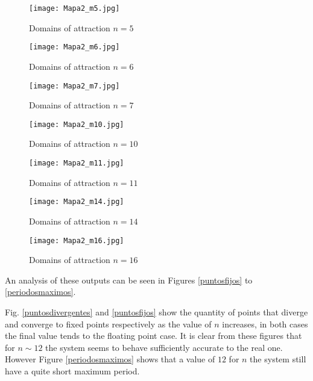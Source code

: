 \documentclass[conference]{IEEEtran}
\begin{document}
\begin{figure}
    \centering
    \texttt{[image: Mapa2\_m5.jpg]}\\
    \caption{Domains of attraction $n=5$}\label{m5otro}
\end{figure}

\begin{figure}
    \centering
    \texttt{[image: Mapa2\_m6.jpg]}\\
    \caption{Domains of attraction $n=6$}\label{m6otro}
\end{figure}

\begin{figure}
    \centering
    \texttt{[image: Mapa2\_m7.jpg]}\\
    \caption{Domains of attraction $n=7$}\label{m7otro}
\end{figure}

\begin{figure}
    \centering
    \texttt{[image: Mapa2\_m10.jpg]}\\
    \caption{Domains of attraction $n=10$}\label{m10otro}
\end{figure}

\begin{figure}
    \centering
    \texttt{[image: Mapa2\_m11.jpg]}\\
    \caption{Domains of attraction $n=11$}\label{m11otro}
\end{figure}



\begin{figure}
    \centering
    \texttt{[image: Mapa2\_m14.jpg]}\\
    \caption{Domains of attraction $n=14$}\label{m14otro}
\end{figure}

\begin{figure}
    \centering
    \texttt{[image: Mapa2\_m16.jpg]}\\
    \caption{Domains of attraction $n=16$}\label{m16otro}
\end{figure}

An analysis of these outputs can be seen in Figures
\ref{puntosfijos} to \ref{periodosmaximos}.

Fig. \ref{puntosdivergentes} and  \ref{puntosfijos} show the
quantity of points that diverge and converge to fixed points
respectively as the value of $n$ increases, in both cases the
final value tends to the floating point case. It is clear from
these figures that for $n \sim 12$ the system seems to behave
sufficiently accurate to the real one. However Figure
\ref{periodosmaximos} shows that a value of $12$ for $n$ the
system still have a quite short maximum period.
\end{document}
